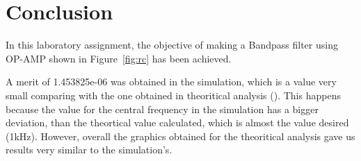 \section{Conclusion}
\label{sec:conclusion}
In this laboratory assignment, the objective of making a Bandpass filter using OP-AMP shown in
Figure~\ref{fig:rc} has been achieved.

A merit of 1.453825e-06 was obtained in the simulation, which is a  value very small comparing with the one obtained in theoritical analysis (). This happens because the value for the central frequency  in the simulation has a bigger deviation, than the theortical value calculated, which is almost the value desired (1kHz). However, overall the graphics obtained for the theoritical analysis gave us results very similar to the simulation's.








